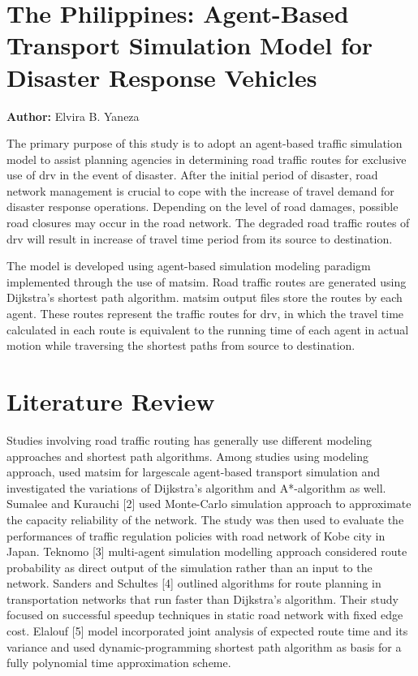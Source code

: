 \section{The Philippines: Agent-Based Transport Simulation Model for Disaster Response Vehicles}
\label{sec:philippines}
\hfill \textbf{Author:} Elvira B. Yaneza

The primary purpose of this study is to adopt an agent-based traffic simulation model to assist planning agencies in determining road traffic routes for exclusive use of \gls{drv} in the event of disaster. After the initial period of disaster, road network management is crucial to cope with the increase of travel demand for disaster response operations. Depending on the level of road damages, possible road closures may occur in the road network. The degraded road traffic routes of \gls{drv} will result in increase of travel time period from its source to destination.

The model is developed using agent-based simulation modeling paradigm implemented through the use of \gls{matsim}. Road traffic routes are generated using Dijkstra’s shortest path algorithm. \gls{matsim} output files store the routes by each agent. These routes represent the traffic routes for \gls{drv}, in which the travel time calculated in each route is equivalent to the running time of each agent in actual motion while traversing the shortest paths from source to destination. 

\section{Literature Review}
Studies involving road traffic routing has generally use different modeling approaches and shortest path algorithms. Among studies using modeling approach, \citet[][]{LefebvreBalmer_TechRep_IVT_2007} used \gls{matsim} for \gls{largescale} agent-based transport simulation and investigated the variations of Dijkstra’s algorithm and A*-algorithm as well. Sumalee and Kurauchi [2] used Monte-Carlo simulation approach to approximate the capacity reliability of the network. The study was then used to evaluate the performances of traffic regulation policies with road network of Kobe city in Japan. Teknomo [3] multi-agent simulation modelling approach considered route probability as direct output of the simulation rather than an input to the network. Sanders and Schultes [4] outlined algorithms for route planning in transportation networks that run faster than Dijkstra’s algorithm. Their study focused on successful speedup techniques in static road network with fixed edge cost. Elalouf [5] model incorporated joint analysis of expected route time and its variance and used dynamic-programming shortest path algorithm as basis for a fully polynomial time approximation scheme. 

